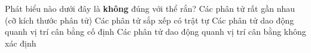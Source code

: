 \begin{ex}
	Phát biểu nào dưới đây là \textbf{không} đúng với thể rắn?
	\choice
	{Các phân tử rất gần nhau (cỡ kích thước phân tử)}
	{Các phân tử sắp xếp có trật tự}
	{Các phân tử dao động quanh vị trí cân bằng cố định}
	{\True Các phân tử dao động quanh vị trí cân bằng không xác định}
	\end{ex}


